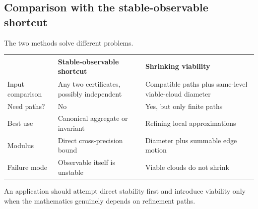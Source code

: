\subsection{Comparison with the stable-observable shortcut}

The two methods solve different problems.

\begin{center}
\begin{tabularx}{0.94\textwidth}{@{}lXX@{}}
\toprule
 & Stable-observable shortcut & Shrinking viability \\
\midrule
Input comparison & Any two certificates, possibly independent & Compatible
paths plus same-level viable-cloud diameter \\
Need paths? & No & Yes, but only finite paths \\
Best use & Canonical aggregate or invariant & Refining local approximations \\
Modulus & Direct cross-precision bound & Diameter plus summable edge motion \\
Failure mode & Observable itself is unstable & Viable clouds do not shrink \\
\bottomrule
\end{tabularx}
\end{center}

An application should attempt direct stability first and introduce viability
only when the mathematics genuinely depends on refinement paths.
